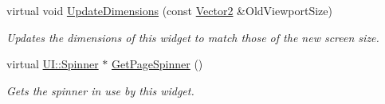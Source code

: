 \begin{DoxyCompactItemize}
virtual void \hyperlink{classphys_1_1UI_1_1PagedCellGrid_a7d6ddd7126f86d2ea6592ac3f9a91037}{UpdateDimensions} (const \hyperlink{classphys_1_1Vector2}{Vector2} \&OldViewportSize)
\begin{DoxyCompactList}\small\item\em Updates the dimensions of this widget to match those of the new screen size. \item\end{DoxyCompactList}\item 
virtual \hyperlink{classphys_1_1UI_1_1Spinner}{UI::Spinner} $\ast$ \hyperlink{classphys_1_1UI_1_1PagedCellGrid_a6d21af1cc6490d1aacbb054dd5fdd555}{GetPageSpinner} ()
\begin{DoxyCompactList}\small\item\em Gets the spinner in use by this widget. \item\end{DoxyCompactList}\end{DoxyCompactItemize}
